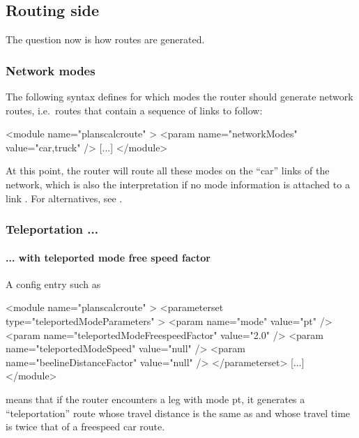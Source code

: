 \subsection{Routing side}

The question now is how routes are generated.

\subsubsection{Network modes}
\label{sec:network-modes}

The following syntax defines for which modes the router should generate network routes, i.e.\ routes that contain a sequence of links to follow:
\begin{xml}
<module name="planscalcroute" >
   <param name="networkModes" value="car,truck" />
   [...]
</module>
\end{xml}
At this point, the router will route all these modes on the ``car'' links of the network, which is also the interpretation if no mode information is attached to a link .  For alternatives, see .



\subsubsection{Teleportation ...}

\paragraph{... with teleported mode free speed factor}

A config entry such as
\begin{xml}
<module name="planscalcroute" >
   <parameterset type="teleportedModeParameters" >
      <param name="mode" value="pt" />
      <param name="teleportedModeFreespeedFactor" value="2.0" />
      <param name="teleportedModeSpeed" value="null" />
      <param name="beelineDistanceFactor" value="null" />
   </parameterset>
   [...]   
</module>      
\end{xml}
means that if the router encounters a leg with mode pt, it generates a ``teleportation'' route whose travel distance is the same as and whose travel time is twice that of a freespeed car route.

